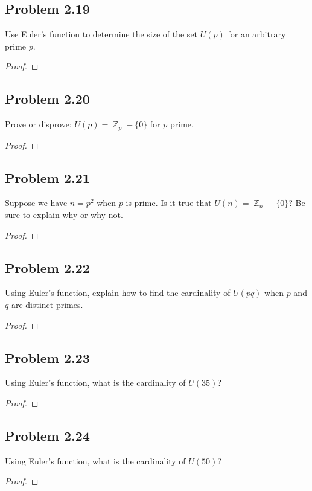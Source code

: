 \documentclass{amsbook}
\DeclareMathOperator{\Z}{\mathbb{Z}}
\begin{document}
			\subsection*{Problem 2.19}
			\label{sub:problem_2_19}
			Use Euler's function to determine the size of the set $U(p)$ for an arbitrary prime $p$.
			\begin{proof}
			\end{proof}

			\subsection*{Problem 2.20}
			\label{sub:problem_2_20}
			Prove or disprove: $U(p) = \Z_{p} - \{0\}$ for $p$ prime.
			\begin{proof}
			\end{proof}

			\subsection*{Problem 2.21}
			\label{sub:problem_2_21}
			Suppose we have $n = p^{2}$ when $p$ is prime. 
			Is it true that $U(n) = \Z_{n} - \{0\}$? 
			Be sure to explain why or why not.
			\begin{proof}
			\end{proof}

			\subsection*{Problem 2.22}
			\label{sub:problem_2_22}
			Using Euler's function, explain how to find the cardinality of $U(pq)$ when $p$ and $q$ are distinct primes.
			\begin{proof}
			\end{proof}

			\subsection*{Problem 2.23}
			\label{sub:problem_2_23}
			Using Euler's function, what is the cardinality of $U(35)$?
			\begin{proof}
			\end{proof}

			\subsection*{Problem 2.24}
			\label{sub:problem_2_24}
			Using Euler's function, what is the cardinality of $U(50)$?
			\begin{proof}
			\end{proof}
\end{document}
